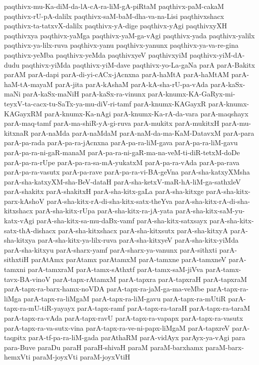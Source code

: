 {paqthivx-mu-Ka-diM-da-lA-cA-ra-liM-gA-piRtaM
paqthivx-paM-cakaM
paqthivx-rU-pA-dalilx
paqthivx-saM-baM-dha-va-na-Lisi
paqthivxshacx
paqthivx-ta-tatxvX-dalilx
paqthivx-yA-dige
paqthivx-yAgi
paqthivxyXH
paqthivxya
paqthivx-yaMga
paqthivx-yaM-ga-vAgi
paqthivx-yada
paqthivx-yalilx
paqthivx-ya-lilx-ruva
paqthivx-yanu
paqthivx-yanunx
paqthivx-ya-va-re-gina
paqthivx-yeMba
paqthivx-yeMda
paqthivxyeV
paqthivxyiM
paqthivx-yiM-dA-dudu
paqthivx-yiMda
paqthivx-yiM-dave
paqthivx-yo-La-gaNa
parA
parA-Bakitx
parAM
parA-dapi
parA-di-yi-cACx-jAcnxna
parA-haMtA
parA-haMtAM
parA-haM-tA-mayaM
parA-jita
parA-kAshaM
parA-kA-sha-rU-pa-vAda
parA-kaSx-maNi
parA-kaSx-maNiH
parA-kaSx-ra-vinunx
parA-knumx-KA-GaRyx-mi-teyxV-ta-cacx-tu-SaTx-ya-mu-diV-ri-tamf
parA-knumx-KAGayxR
parA-knumx-KAGayxRM
parA-knumx-Ka-nAgi
parA-knumx-Ka-rA-da-vara
parA-maqshayx
parA-maq-tamf
parA-ma-shiR-yA-gi-ruva
parA-mukitx
parA-mukitxH
parA-mu-kitxnaR
parA-naMda
parA-naMdaM
parA-naM-da-ma-KaM-DatavxM
parA-para
parA-pa-rada
parA-pa-ra-jAcnxna
parA-pa-ra-liM-gava
parA-pa-ra-liM-gavu
parA-pa-ra-ni-gaR-manaM
parA-pa-ra-ni-gaR-ma-na-veM-ti-diR-tetxM-doDe
parA-pa-ra-rUpe
parA-pa-ra-sa-mA-yukatxM
parA-pa-ra-vAda
parA-pa-rava
parA-pa-ra-vasutx
parA-pa-rave
parA-pa-ra-vi-BA-geVna
parA-sha-katxyXMsha
parA-sha-katxyXM-sha-BeV-dataH
parA-sha-ketxV-maR-hA-liM-ga-sathxleV
parA-shakitx
parA-shakitxH
parA-sha-kitx-gaLa
parA-sha-kitxge
parA-sha-kitx-parx-kAshoV
parA-sha-kitx-rA-di-sha-kitx-satx-theYva
parA-sha-kitx-rA-di-sha-kitxshacx
parA-sha-kitx-rUpa
parA-sha-kitx-ra-jA-yata
parA-sha-kitx-saM-yu-katx-vAgi
parA-sha-kitx-sa-mu-daBx-vamf
parA-sha-kitx-satxsayx
parA-sha-kitx-satx-thA-dishacx
parA-sha-kitxshacx
parA-sha-kitxsutx
parA-sha-kitxyA
parA-sha-kitxya
parA-sha-kitx-ya-lilx-ruva
parA-sha-kitxyeV
parA-sha-kitx-yiMda
parA-sha-kitxyu
parA-sharx-yamf
parA-sharx-ya-vanunx
parA-sithxti
parA-sithxtiH
parAtAmx
parAtamx
parAtamxM
parA-tamxne
parA-tamxneV
parA-tamxni
parA-tamxraM
parA-tamx-sAthxtf
parA-tamx-saM-jiVva
parA-tamx-tavx-BA-vinoV
parA-tapx-rAtamxM
parA-tapxra
parA-tapxraH
parA-tapxraM
parA-tapx-ra-barx-hamx-noVDA
parA-tapx-ra-jaM-ga-ma-veMbe
parA-tapx-ra-liMga
parA-tapx-ra-liMgaM
parA-tapx-ra-liM-gavu
parA-tapx-ra-mUtiR
parA-tapx-ra-mU-tiR-yayayx
parA-tapx-ramf
parA-tapx-ra-taraH
parA-tapx-ra-taraM
parA-tapx-ra-vAda
parA-tapx-ravU
parA-tapx-ra-vapapx
parA-tapx-ra-vasutx
parA-tapx-ra-va-sutx-vina
parA-tapx-ra-ve-ni-papx-liMgaM
parA-tapxreV
parA-taqpitx
parA-tf-pa-ra-liM-gada
parAthaRM
parA-vidAyx
parAyx-ya-vAgi
para
para-Buve
paraDu
paraH
paraH-shivaH
paraM
paraM-barxhamx
paraM-barx-hemxVti
paraM-joyxVti
paraM-joyxVtiH
}
